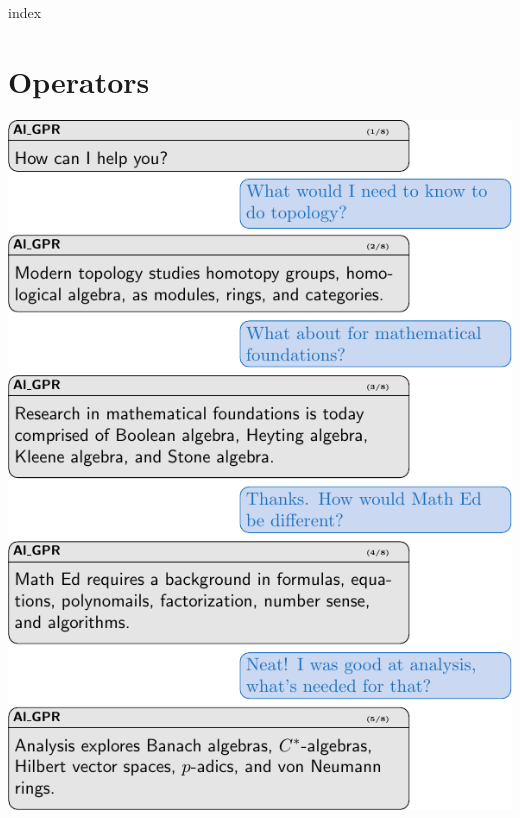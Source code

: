 \documentclass[12pt,twoside,letterpaper]{memoir}
\begin{document}
% 
\cleardoublepage


\mainmatter%


{index}


\part{Operators}
\cleardoublepage
\pagestyle{empty}
\includegraphics[width=\textwidth]{3-operators/AlGPR.pdf}
\newpage
\pagestyle{empty}
\end{document}
